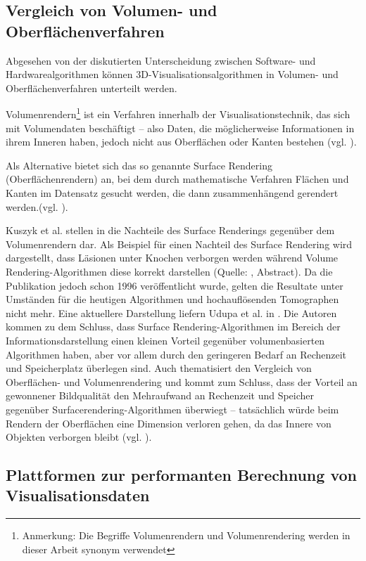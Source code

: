 \documentclass[ngerman,pdftex,paper=A4,DIV=calc,titlepage,12pt]{scrartcl}
\newtheorem[L]{boxedDefinition}{Definition}
\begin{document}
\subsection{Vergleich von Volumen- und Oberflächenverfahren}\label{ssec:volsurfacealgorithms}
Abgesehen von der diskutierten Unterscheidung zwischen Software- und Hardwarealgorithmen können 3D-Visualisationsalgorithmen in Volumen- und Oberflächenverfahren unterteilt werden.

Volumenrendern\footnote{Anmerkung: Die Begriffe Volumenrendern und Volumenrendering werden in dieser Arbeit synonym verwendet} ist ein Verfahren innerhalb der Visualisationstechnik, das sich mit Volumendaten beschäftigt -- also Daten, die möglicherweise Informationen in ihrem Inneren haben, jedoch nicht aus Oberflächen oder Kanten bestehen (vgl. \cite[Kapitel 1, Seite 2]{Bruckner2004}).

Als Alternative bietet sich das so genannte Surface Rendering (\glqq Oberflächenrendern\grqq) an, bei dem durch mathematische Verfahren Flächen und Kanten im Datensatz gesucht werden, die dann zusammenhängend gerendert werden.(vgl. \cite[Kapitel 1, Seite 2f.]{Bruckner2004}).

Kuszyk et al. stellen in \cite{Kuszyk1996} die Nachteile des Surface Renderings gegenüber dem Volumenrendern dar. Als Beispiel für einen Nachteil des Surface Rendering wird dargestellt, dass Läsionen unter Knochen verborgen werden während Volume Rendering-Algorithmen diese korrekt darstellen (Quelle: \cite{Kuszyk1996}, Abstract). Da die Publikation jedoch schon 1996 veröffentlicht wurde, gelten die Resultate unter Umständen für die heutigen Algorithmen und hochauflösenden Tomographen nicht mehr. Eine aktuellere Darstellung liefern Udupa et al. in \cite{Udupa2009}. Die Autoren kommen zu dem Schluss, dass Surface Rendering-Algorithmen im Bereich der Informationsdarstellung einen kleinen Vorteil gegenüber volumenbasierten Algorithmen haben, aber vor allem durch den geringeren Bedarf an Rechenzeit und Speicherplatz überlegen sind. Auch \cite{Bruckner2004} thematisiert den Vergleich von Oberflächen- und Volumenrendering und kommt zum Schluss, dass  der Vorteil an gewonnener Bildqualität den Mehraufwand an Rechenzeit und Speicher gegenüber Surfacerendering-Algorithmen überwiegt -- tatsächlich würde beim Rendern der Oberflächen eine Dimension verloren gehen, da das Innere von Objekten verborgen bleibt (vgl. \cite[Seite 2f.]{Bruckner2004}).

\subsection{Plattformen zur performanten Berechnung von Visualisationsdaten}\label{ssec:platforms}
\end{document}
